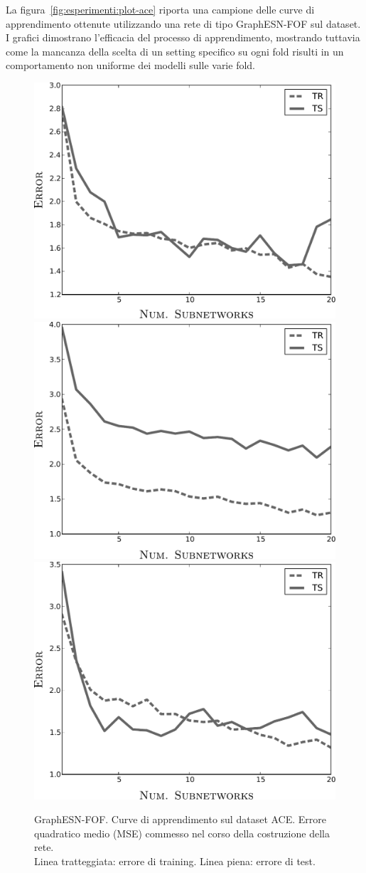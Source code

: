 La figura~\vref{fig:esperimenti:plot-ace} riporta una campione delle curve di apprendimento ottenute utilizzando una rete di tipo GraphESN-FOF sul dataset. I grafici dimostrano l'efficacia del processo di apprendimento, mostrando tuttavia come la mancanza della scelta di un setting specifico su ogni fold risulti in un comportamento non uniforme dei modelli sulle varie fold.
\begin{figure}[p]
\centering
\includegraphics[width=0.5\columnwidth]{img/plot/ace1}\\
\vspace*{0.8cm}
\includegraphics[width=0.5\columnwidth]{img/plot/ace2}\\
\vspace*{0.8cm}
\includegraphics[width=0.5\columnwidth]{img/plot/ace3}\\
\medskip
\caption[ACE: curve di apprendimento.]{GraphESN-FOF. Curve di apprendimento sul dataset ACE. Errore quadratico medio (MSE) commesso nel corso della costruzione della rete.\\
Linea tratteggiata: errore di training. Linea piena: errore di test.}
\label{fig:esperimenti:plot-ace}
\end{figure}


